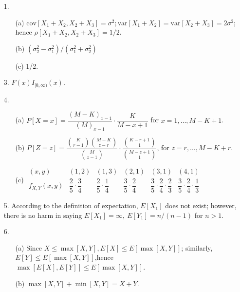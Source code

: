 \begin{enumerate}
	\item[1.] \begin{itemize}
		\item[(a)] $\mbox{cov}[X_1+X_2, X_2+X_3]=\sigma^2; \mbox{var}[X_1+X_2]=\mbox{var}[X_2+X_3]=2\sigma^2;$ \\
		hence $\rho[X_1+X_2, X_2+X_3] = 1/2$.
		\item[(b)] $(\sigma_2^2-\sigma_1^2)/(\sigma_1^2+\sigma_2^2)$ 
		\item[(c)] 1/2.
	\end{itemize}

	\item[3.] $F(x)I_{[0,\infty)}(x)$.
	
	\item[4.] \begin{enumerate}
		\item[(a)] $P[X=x] = \dfrac{(M-K)_{x-1}}{(M)_{x-1}} \cdot \dfrac{K}{M-x+1}$ for $x=1,\ldots, M-K+1$.
		\item[(b)] $P[Z=z] = \dfrac{\displaystyle {K\choose r-1}{M-K\choose z-r}}{\displaystyle{M\choose z-1}} \cdot \dfrac{\displaystyle {K-r+1\choose 1}}{\displaystyle{M-z+1\choose 1}}$, for $z=r,\ldots, M-K+r.$ 
		\item[(c)] $\begin{array}{c||c|c|c|c|c}
			(x,y) & (1,2) & (1,3) & (2,1) & (3,1) & (4,1) \\ \hline
			f_{X,Y}(x,y) & \dfrac{2}{5}\cdot\dfrac{3}{4} & \dfrac{2}{5}\cdot\dfrac{1}{4} & \dfrac{3}{5}\cdot\dfrac{2}{4} & \dfrac{3}{5}\cdot\dfrac{2}{4}\cdot\dfrac{2}{3} & \dfrac{3}{5}\cdot\dfrac{2}{4}\cdot\dfrac{1}{3}
		\end{array}$
	\end{enumerate}

	\item[5.] According to the definition of expectation, $E[X_1]$ does not exist; however, there is no harm in saying $E[X_1]=\infty,\ E[Y_1] = n/(n-1)$ for $n>1$.

	\item[6.] \begin{enumerate}
		\item[(a)] Since $X\le \max[X,Y], E[X]\le E[\max[X,Y]]$; similarly, \\
			$E[Y]\le E[\max[X,Y]]$,hence $\max[E[X],E[Y]]\le E[\max[X,Y]]$.
		\item[(b)] $\max[X,Y]+\min[X,Y] = X + Y$. 
	\end{enumerate}


\end{enumerate}
